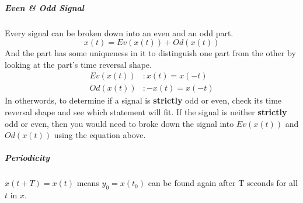 \documentclass[12pt, letterpaper]{article}
\begin{document}
\subparagraph*{Even \& Odd Signal} Every signal can be broken down into an even and an odd part.
$$x(t) = Ev(x(t)) + Od(x(t))$$
And the part has some uniqueness in it to distinguish one part from the other by looking at the part's time reversal shape.
\begin{align*}
    Ev(x(t))&: x(t) = x(-t) \\
    Od(x(t))&: -x(t) = x(-t)
\end{align*}
In otherwords, to determine if a signal is \textbf{strictly} odd or even, check its time reversal shape and see which statement will fit. If the signal is neither \textbf{strictly} odd or even, then you would need to broke down the signal into $Ev(x(t))$ and $Od(x(t))$ using the equation above.

\subparagraph*{Periodicity} $x(t+T) = x(t)$ means $y_0 = x(t_0)$ can be found again after T seconds for all $t$ in $x$.
\end{document}
